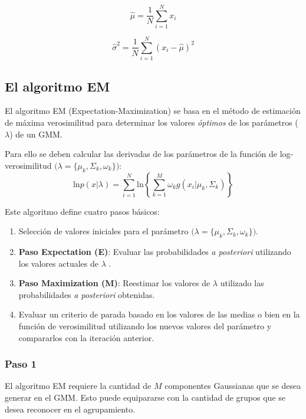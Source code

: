 \documentclass[a4paper]{article}
\begin{document}
\begin{equation}
\hat{\mu} = \frac{1}{N}\sum_{i=1}^{N}x_i
\label{eq:media}
\end{equation}

\begin{equation}
\hat{\sigma}^2 = \frac{1}{N}\sum_{i=1}^{N}(x_i - \hat{\mu})^2
\label{eq:covarianza}
\end{equation}




\subsection{El algoritmo EM} %
\label{sub:el_algoritmo_em}
El algoritmo EM (Expectation-Maximization) se basa en el método de estimación de máxima verosimilitud para determinar los valores \emph{óptimos} de los parámetros ($\lambda$) de un GMM.

Para ello se deben calcular las derivadas de los parámetros de la función de log-verosimilitud $\big(\lambda = \{ \mu_k, \Sigma_k, \omega_k \} \big )$:
$$
\text{ln}p(x|\lambda) = \sum_{i=1}^N\text{ln} \left\{ \sum_{k=1}^{M} \omega _k g \left ( x_i | \mu_k,\Sigma_k \right )  \right\}
$$

Este algoritmo define cuatro pasos básicos:
\begin{enumerate}
	\item Selección de valores iniciales para el parámetro $\big(\lambda = \{ \mu_k, \Sigma_k, \omega_k \} \big )$.
	\item \textbf{Paso Expectation (E)}: Evaluar las probabilidades \emph{a posteriori} utilizando los valores actuales de $\lambda$ .
	\item \textbf{Paso Maximization (M)}: Reestimar los valores de $\lambda$ utilizado las probabilidades \emph{a posteriori} obtenidas.
	\item Evaluar un criterio de parada basado en los valores de las medias o bien en la función de verosimilitud utilizando los nuevos valores del parámetro y compararlos con la iteración anterior.
\end{enumerate}

\subsubsection{Paso 1} %
\label{ssub:paso_1}
El algoritmo EM requiere la cantidad de $M$ componentes Gaussianas que se desea generar en el GMM.
Esto puede equipararse con la cantidad de grupos que se desea reconocer en el agrupamiento.
\end{document}
